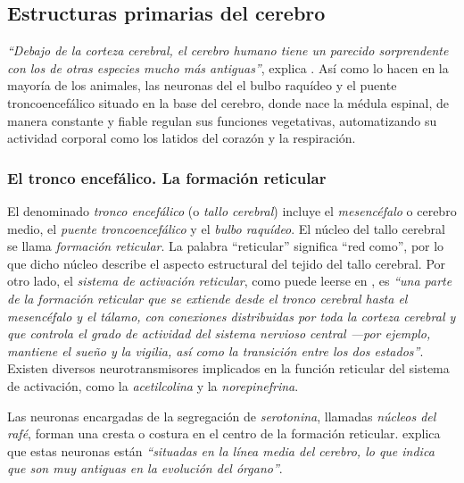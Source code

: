 \subsection{Estructuras primarias del cerebro}
\label{sec::estructuras-primarias}

{\it ``Debajo de la corteza cerebral, el cerebro humano tiene un parecido sorprendente con los de otras especies mucho más antiguas''}, explica \cite{Czerner2001}. Así como lo hacen en la mayoría de los animales, las neuronas del el bulbo raquídeo y el puente troncoencefálico situado en la base del cerebro, donde nace la médula espinal, de manera constante y fiable regulan sus funciones vegetativas, automatizando su actividad corporal como los latidos del corazón y la respiración. 

\subsubsection{El tronco encefálico. La formación reticular}

El denominado {\it tronco encefálico} (o {\it tallo cerebral}) incluye el  {\it mesencéfalo} o cerebro medio,  el {\it puente troncoencefálico} y el {\it bulbo raquídeo}. El núcleo del tallo cerebral se llama {\it formación reticular}. La palabra {``reticular''} significa {``red como''}, por lo que dicho núcleo describe el aspecto estructural del tejido del tallo cerebral. Por otro lado, el {\it sistema de activación reticular}, como puede leerse en \cite{Lindberg.}, es {\it ``una parte de la formación reticular que se extiende desde el tronco cerebral hasta el mesencéfalo y el tálamo, con conexiones distribuidas por toda la corteza cerebral y que controla el grado de actividad del sistema nervioso central ---por ejemplo, mantiene el sueño y la vigilia, así como la transición entre los dos estados''}. Existen diversos neurotransmisores implicados en la función reticular del sistema de activación, como la {\it acetilcolina} y  la {\it norepinefrina}. 

Las neuronas encargadas de la segregación de {\it serotonina}, llamadas  {\it núcleos del rafé}, forman una cresta o costura en el centro de la formación reticular. \cite{Panksepp1998} explica que estas neuronas están {\it ``situadas en la línea media del cerebro, lo que indica que son muy antiguas en la evolución del órgano''}. 


